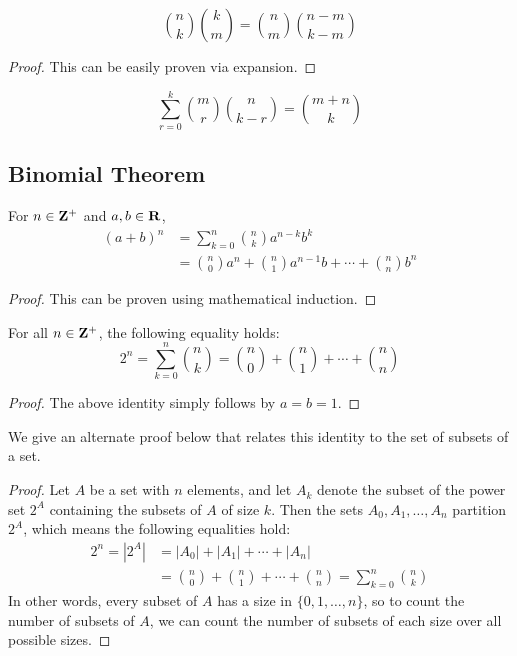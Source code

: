 \begin{proposition}
\begin{equation}
\binom{n}{k}\binom{k}{m}=\binom{n}{m}\binom{n-m}{k-m}
\end{equation}
\end{proposition}
\begin{proof}
This can be easily proven via expansion.
\end{proof}

\begin{lemma}
\begin{equation}
\sum_{r=0}^{k} \binom{m}{r} \binom{n}{k-r} = \binom{m+n}{k}
\end{equation}
\end{lemma}

\subsection{Binomial Theorem}
\begin{theorem} 
For $n \in \mathbf Z^{+}$ and $a,b\in\mathbf R$, 
\begin{equation}
\begin{split}
(a+b)^n &= \sum_{k=0}^n\binom{n}{k}a^{n-k}b^k\\
&= \binom{n}{0}a^n + \binom{n}{1}a^{n-1}b + \cdots + \binom{n}{n}b^n
\end{split}
\end{equation}
\end{theorem}

\begin{proof}
This can be proven using mathematical induction.
\end{proof}

\begin{corollary}
For all $n\in\mathbf Z^{+}$, the following equality holds:
\begin{equation}
2^n = \sum_{k=0}^{n} \binom{n}{k} = \binom{n}{0}+\binom{n}{1}+\cdots+\binom{n}{n}
\end{equation}
\end{corollary}
\begin{proof}
The above identity simply follows by $a=b=1$.
\end{proof}

We give an alternate proof below that relates this identity to the set of subsets of a set.

\begin{proof}
Let $A$ be a set with $n$ elements, and let $A_k$ denote the subset of the power set $2^A$ containing the subsets of $A$ of size $k$. Then the sets $A_0,A_1,\dots,A_n$ partition $2^A$, which means the following
equalities hold:
\begin{align*}
2^n=|2^A| &= |A_0|+|A_1|+\cdots+|A_n| \\
&= \binom{n}{0}+\binom{n}{1}+\cdots+\binom{n}{n} = \sum_{k=0}^{n} \binom{n}{k}
\end{align*}
In other words, every subset of $A$ has a size in $\{0,1,\dots,n\}$, so to count the number of subsets of $A$, we can count the number of subsets of each size over all possible sizes.
\end{proof}

